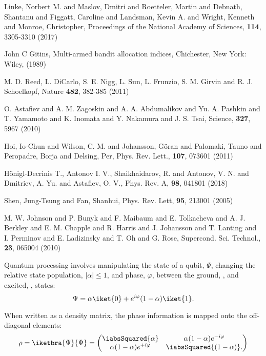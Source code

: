
\begin{thebibliography}{99}

 Linke,  Norbert M. and Maslov,  Dmitri and Roetteler, Martin  and Debnath,
  Shantanu  and Figgatt,  Caroline and  Landsman, Kevin  A.  and  Wright, Kenneth  and Monroe,
  Christopher, Proceedings of the National Academy of Sciences, \textbf{114}, 3305-3310 (2017)

 John  C Gitins, Multi-armed  bandit allocation indices,  Chichester, New
  York: Wiley, (1989)
        
 {M.  D. Reed, L. DiCarlo, S. E. Nigg, L. Sun, L.  Frunzio, S. M. Girvin and
    R. J. Schoelkopf}, Nature \textbf{482}, 382-385 (2011)

 O.  Astafiev  and A.  M.  Zagoskin  and A.  A.  Abdumalikov  and Yu. A.
  Pashkin  and T.   Yamamoto and  K.  Inomata  and  Y.  Nakamura  and J.   S.  Tsai,  Science,
  \textbf{327}, 5967 (2010)

 Hoi, Io-Chun and Wilson, C.   M.  and Johansson, G\"oran and Palomaki, Tauno
  and Peropadre, Borja and Delsing, Per, Phys. Rev.  Lett., \textbf{107}, 073601 (2011)

 H\"onigl-Decrinis T., Antonov I. V., Shaikhaidarov, R. and Antonov, V. N.
  and Dmitriev, A.  Yu.  and Astafiev, O.  V., Phys. Rev.  A, \textbf{98}, 041801 (2018)

 Shen, Jung-Tsung  and Fan, Shanhui, Phys.  Rev.   Lett, \textbf{95}, 213001
  (2005)

 {M.  W.  Johnson and P.  Bunyk  and F.  Maibaum and E. Tolkacheva and A.
    J.  Berkley  and E.   M. Chapple and  R. Harris and  J.  Johansson  and T. Lanting  and I.
    Perminov  and E.   Ladizinsky  and T.   Oh  and G.   Rose},  {Supercond. Sci.   Technol.},
  \textbf{23}, {065004} (2010)

  Quantum  processing involves  manipulating  the  state  of a  qubit,  $\Psi$,
  changing the relative state population, $\ensuremath{|\alpha|}  \le 1$, and phase, $\varphi$, between the
  ground, , and excited, , states:
  \begin{equation}
    \label{eq:4}
    \Psi = \alpha\iket{0} + e^{i\varphi}(1-\alpha)\iket{1}.
  \end{equation}

  \noindent  When written  as a  density  matrix, the  phase  information is  mapped onto  the
  off-diagonal elements:
  \begin{equation}
    \label{eq:5}
    \rho = \iketbra{\Psi}{\Psi} = \begin{pmatrix}
      \iabsSquared{\alpha}  & \alpha(1-\alpha)e^{-i\varphi}\\
      \alpha(1-\alpha)e^{+i\varphi} & \iabsSquared{(1-\alpha)}.
    \end{pmatrix}
  \end{equation}


\end{thebibliography}
